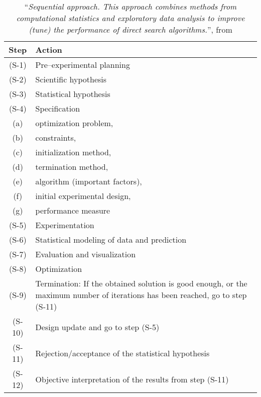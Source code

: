 \begin{table}[htdp]
\footnotesize
\caption{``\textit{Sequential approach. This approach combines methods from computational statistics and exploratory data analysis to improve (tune) the performance of direct search algorithms.}'', from \protect \cite[p. 417]{Bartz-Beielstein2004}}
\label{tab:experimentsequence}
\begin{center}
\begin{tabular}{|c|p{10cm}|}
\hline
Step & Action\\
\hline
(S-1) & Pre–experimental planning\\
(S-2) & Scientific hypothesis\\
(S-3) & Statistical hypothesis\\
(S-4) & Specification\\
(a) & optimization problem,\\
(b) & constraints,\\
(c) & initialization method,\\
(d) & termination method,\\
(e) & algorithm (important factors),\\ 
(f) & initial experimental design,\\ 
(g) & performance measure\\
(S-5) & Experimentation\\
(S-6) & Statistical modeling of data and prediction\\
(S-7) & Evaluation and visualization\\
(S-8) & Optimization\\
(S-9) & Termination: If the obtained solution is good enough, or the maximum number of iterations has
been reached, go to step (S-11)\\
(S-10) & Design update and go to step (S-5)\\
(S-11) & Rejection/acceptance of the statistical hypothesis\\
(S-12) & Objective interpretation of the results from step (S-11)\\
\hline
\end{tabular}
\end{center}
\end{table}%
